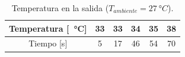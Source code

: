 \begin{table}[H]
	\centering
	\begin{tabular}{cccccc}
	\toprule
		Temperatura [\SI{}{\degree}C] & 33 & 33 & 34 & 35 & 38 \\
		\midrule
		Tiempo [s] & 5 & 17 & 46 & 54 & 70 \\
		\bottomrule
	\end{tabular}
	\caption{Temperatura en la salida ($T_{ambiente}= \SI{27}{\degree}C$).}
	\label{tab.temp}
\end{table}



